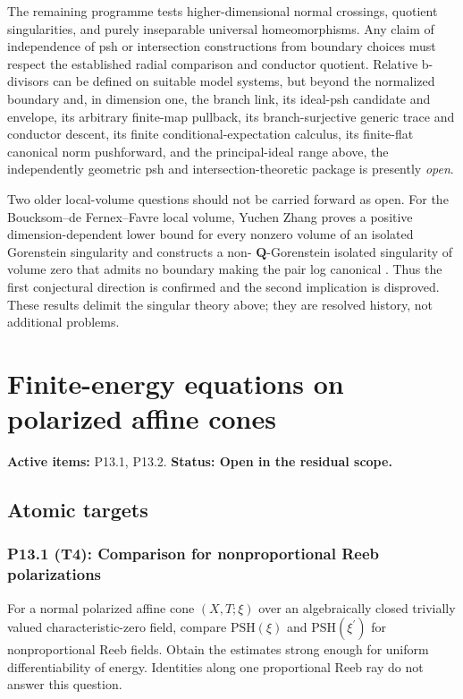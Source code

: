 \documentclass[11pt,a4paper]{article}
\theoremstyle{definition}
\theoremstyle{remark}
\renewcommand{\index}[1]{}
\newcommand{\PSH}{\mathrm{PSH}}
\begin{document}
The remaining programme tests higher-dimensional normal crossings, quotient
singularities, and purely inseparable universal homeomorphisms.  Any claim of
independence of psh or intersection constructions from boundary choices
must respect the established radial comparison and conductor quotient.
Relative b-divisors can be defined on suitable model systems, but beyond
the normalized boundary and, in dimension one, the branch link, its ideal-psh candidate and envelope,
its arbitrary finite-map pullback, its branch-surjective generic trace and
conductor descent, its finite conditional-expectation calculus, its
finite-flat canonical norm pushforward, and the
principal-ideal range above, the independently
geometric psh and intersection-theoretic package is
presently \emph{open}.

\index{local volume!resolved questions}
Two older local-volume questions should not be carried forward as open.
For the Boucksom--de Fernex--Favre local volume, Yuchen Zhang proves a
positive dimension-dependent lower bound for every nonzero volume of an
isolated Gorenstein singularity and constructs a non-
\(\mathbf Q\)-Gorenstein isolated singularity of volume zero that admits no
boundary making the pair log canonical
\cite{Zhang14LocalVolume}.  Thus the first conjectural
direction is confirmed and the second implication is disproved.  These
results delimit the singular theory above; they are resolved history, not
additional problems.

\clearpage\section{Finite-energy equations on polarized affine cones}
\label{family:7}
\noindent\textbf{Active items:} P13.1, P13.2. \textbf{Status: Open in the residual scope.}

\subsection{Atomic targets}
\subsubsection*{P13.1 (T4): Comparison for nonproportional Reeb polarizations}
\label{atom:P13.1}
For a normal polarized affine cone \((X,T;\xi)\) over an algebraically closed trivially valued characteristic-zero field, compare \(\PSH(\xi)\) and \(\PSH(\xi^{\prime})\) for nonproportional Reeb fields. Obtain the estimates strong enough for uniform differentiability of energy. Identities along one proportional Reeb ray do not answer this question.
\end{document}
